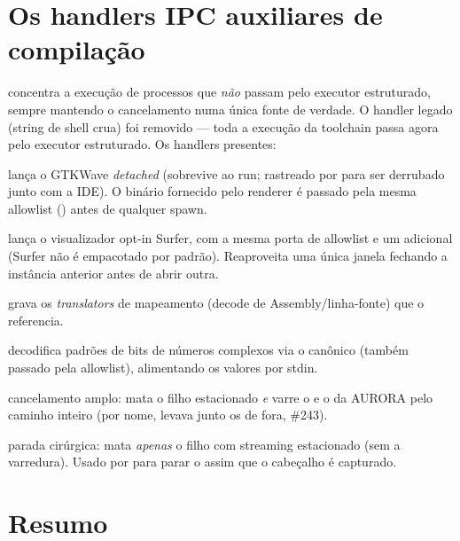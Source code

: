 \section{Os handlers IPC auxiliares de compilação}
\label{sec:08-ipc-auxiliares}

 concentra a execução de processos que \emph{não}
passam pelo executor estruturado, sempre mantendo o cancelamento numa única
fonte de verdade. O handler legado  (string de shell crua) foi
removido — toda a execução da toolchain passa agora pelo executor estruturado.
Os handlers presentes:

\begin{description}[leftmargin=1.4em]
  \item[\code{launch-gtkwave-only}] lança o GTKWave \emph{detached} (sobrevive ao
    run; rastreado por  para ser derrubado junto com a IDE). O
    binário fornecido pelo renderer é passado pela mesma allowlist
    () antes de qualquer spawn.
  \item[\code{launch-surfer}] lança o visualizador opt-in Surfer, com a mesma
    porta de allowlist e um  adicional (Surfer não é
    empacotado por padrão). Reaproveita uma única janela fechando a instância
    anterior antes de abrir outra.
  \item[\code{write-surfer-mappings}] grava os \emph{translators} de mapeamento
    (decode de Assembly/linha-fonte) que o  referencia.
  \item[\code{decode-complex}] decodifica padrões de bits de números complexos
    via o canônico  (também passado pela allowlist),
    alimentando os valores por stdin.
  \item[\code{cancel-vvp-process}] cancelamento amplo: mata o filho estacionado
    \emph{e} varre o  e o  da AURORA pelo
    caminho inteiro (por nome, levava junto os de fora, \#243).
  \item[\code{kill-current-spec-process}] parada cirúrgica: mata \emph{apenas} o
    filho com streaming estacionado (sem a varredura). Usado por
     para parar o  assim que o cabeçalho
    é capturado.
\end{description}

\section{Resumo}
\label{sec:08-resumo}

